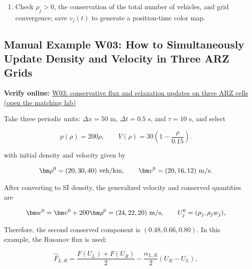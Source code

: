 \documentclass[11pt,a4paper,openany]{book}
\numberwithin{equation}{chapter}
\numberwithin{figure}{chapter}
\numberwithin{table}{chapter}
\newcommand{\onlinelab}[2]{%
  \par\smallskip\noindent
  {\small\sffamily\color{teal}\textbf{Verify online: }\href{https://cwan-ucr.github.io/traffic-stability-book/lab/?case=#1}{#2 (open the matching lab)}}%
  \par\smallskip}
\begin{document}
\begin{tcolorbox}[experimentbox,title=\textbf{Pseudocode for the Macro-scale Finite Volume Algorithm}]
\begin{enumerate}[leftmargin=1.7em,itemsep=2pt]
Apply relaxation source terms to each element and restore $\rho_j,v_j$ from the new conservation equation.







\item




Check $\rho_j>0$, the conservation of the total number of vehicles, and grid convergence; save $v_j(t)$ to generate a position-time color map.







\end{enumerate}
\end{tcolorbox}

\subsection{Manual Example W03: How to Simultaneously Update Density and Velocity in Three ARZ Grids}
\onlinelab{W03}{W03: conservative flux and relaxation updates on three ARZ cells}


\label{sub:worked-arz}




Take three periodic units: $\Delta x=50$ m, $\Delta t=0.5$ s, and $\tau=10$ s, and select

\[
p(\rho)=200\rho,\qquad
V(\rho)=30\left(1-\frac{\rho}{0.15}\right).
\]

with initial density and velocity given by

\[
\bm\rho^0=(20,30,40)\ {\rm veh/km},\qquad
\bm v^0=(20,16,12)\ {\rm m/s}.
\]

After converting to SI density, the generalized velocity and conserved quantities are

\begin{equation}
\bm w^0=\bm v^0+200\bm\rho^0=(24,22,20)\ {\rm m/s},
\qquad
U^0_j=(\rho_j,\rho_jw_j),
\label{eq:w03-conserved-initial}
\end{equation}

Therefore, the second conserved component is $(0.48,0.66,0.80)$. In this example, the Rusanov flux is used:

\begin{equation}
\widehat F_{L,R}
=\frac{F(U_L)+F(U_R)}{2}
-\frac{\alpha_{L,R}}{2}(U_R-U_L),
\label{eq:w03-rusanov}
\end{equation}
\end{document}
